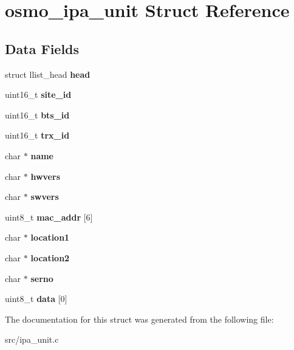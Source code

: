 \section{osmo\+\_\+ipa\+\_\+unit Struct Reference}
\label{structosmo__ipa__unit}
\subsection*{Data Fields}
\begin{DoxyCompactItemize}
\item 
struct llist\+\_\+head {\bfseries head}\label{structosmo__ipa__unit_af6e4d3706264d8ec483a08cff456dc2c}

\item 
uint16\+\_\+t {\bfseries site\+\_\+id}\label{structosmo__ipa__unit_a2b3a37c6d15fbf8a8ef4b8c42b55a1ad}

\item 
uint16\+\_\+t {\bfseries bts\+\_\+id}\label{structosmo__ipa__unit_a9b072b5702ee31e3ca12323a99bf5b7d}

\item 
uint16\+\_\+t {\bfseries trx\+\_\+id}\label{structosmo__ipa__unit_afa861e7893b14cc5de1d5e495c183d16}

\item 
char $\ast$ {\bfseries name}\label{structosmo__ipa__unit_a43b0bf6664e231d4e8891df310ce5a10}

\item 
char $\ast$ {\bfseries hwvers}\label{structosmo__ipa__unit_a204bb938ce6be0fc1f263387d226ab2d}

\item 
char $\ast$ {\bfseries swvers}\label{structosmo__ipa__unit_aafccbfb530d5e94a5f9cf1b20824b10d}

\item 
uint8\+\_\+t {\bfseries mac\+\_\+addr} [6]\label{structosmo__ipa__unit_a2492ae682d3d902761e0d2ff5038642e}

\item 
char $\ast$ {\bfseries location1}\label{structosmo__ipa__unit_a9de8d7ec217c28fb22081d76d0348d92}

\item 
char $\ast$ {\bfseries location2}\label{structosmo__ipa__unit_a45eda8d32a6c6aa6e235f8ef710373fc}

\item 
char $\ast$ {\bfseries serno}\label{structosmo__ipa__unit_ae1d5958e1ca9db7f29f62ee535f40057}

\item 
uint8\+\_\+t {\bfseries data} [0]\label{structosmo__ipa__unit_aafa110002f823370332cc2544b86e8b9}

\end{DoxyCompactItemize}


The documentation for this struct was generated from the following file\+:\begin{DoxyCompactItemize}
\item 
src/ipa\+\_\+unit.\+c\end{DoxyCompactItemize}
